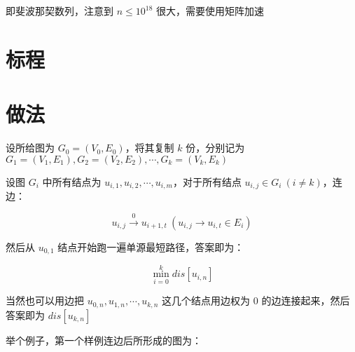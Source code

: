 \documentclass{ctsol}
\begin{document}
即斐波那契数列，注意到 $n \leq {10}^{18}$ 很大，需要使用矩阵加速

\section*{标程}


\makesolution
\section*{做法}

设所给图为 $G_0=(V_0,E_0)$，将其复制 $k$ 份，分别记为 $G_1=(V_1,E_1),G_2=(V_2,E_2),\cdots,G_k=(V_k,E_k)$

设图 $G_i$ 中所有结点为 $u_{i,1},u_{i,2},\cdots,u_{i,m}$，对于所有结点 $u_{i,j} \in G_i~(i \neq k)$，连边：

$$u_{i,j} \xrightarrow{0} u_{i+1,t}~(u_{i,j} \rightarrow u_{i,t} \in E_i)$$

然后从 $u_{0,1}$ 结点开始跑一遍单源最短路径，答案即为：

$$\min\limits_{i=0}^{k}dis[u_{i,n}]$$

当然也可以用边把 $u_{0,n},u_{1,n},\cdots,u_{k,n}$ 这几个结点用边权为 $0$ 的边连接起来，然后答案即为 $dis[u_{k,n}]$

举个例子，第一个样例连边后所形成的图为：
\end{document}

